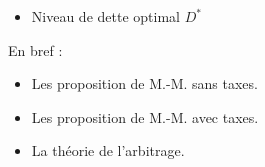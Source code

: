 \documentclass[10pt, french]{article}
\begin{document}
\begin{multicols*}{2}
\begin{center}
\begin{tikzpicture}[x=0.75pt,y=0.75pt,yscale=-1,xscale=1]
\end{tikzpicture}
\end{center}

\begin{itemize}
	\item	Niveau de dette optimal $D^{\ast}$
\end{itemize}


En bref : 
\begin{itemize}
	\item	Les proposition de M.-M. sans taxes.
	\item	Les proposition de M.-M. avec taxes.
	\item	La théorie de l'arbitrage.
\end{itemize}

\end{multicols*}
\end{document}
